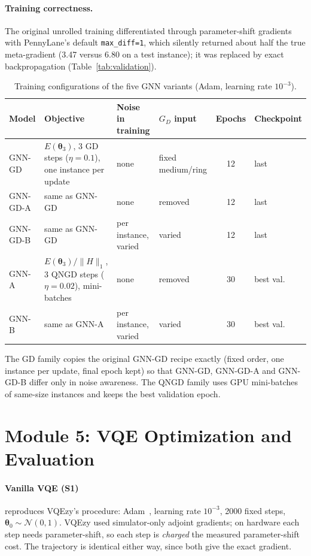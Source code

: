 \documentclass{ssnreview}
\begin{document}
\paragraph{Training correctness.} The original unrolled training differentiated through
parameter-shift gradients with PennyLane's default \texttt{max\_diff=1}, which silently returned
about half the true meta-gradient (3.47 versus 6.80 on a test instance); it was replaced by
exact backpropagation (Table~\ref{tab:validation}).

\begin{table}[H]
\centering
\caption{Training configurations of the five GNN variants (Adam, learning rate $10^{-3}$).}\label{tab:configs}
\small
\begin{tabularx}{\textwidth}{L{1.7cm}YL{2.3cm}L{2.2cm}cL{1.5cm}}
\toprule
Model & Objective & Noise in training & $G_D$ input & Epochs & Checkpoint \\
\midrule
GNN-GD   & $E(\boldsymbol\theta_3)$, 3 GD steps ($\eta=0.1$), one instance per update & none & fixed medium/ring & 12 & last \\
GNN-GD-A & same as GNN-GD & none & removed & 12 & last \\
GNN-GD-B & same as GNN-GD & per instance, varied & varied & 12 & last \\
GNN-A    & $E(\boldsymbol\theta_3)/\|H\|_1$, 3 QNGD steps ($\eta=0.02$), mini-batches & none & removed & 30 & best val. \\
GNN-B    & same as GNN-A & per instance, varied & varied & 30 & best val. \\
\bottomrule
\end{tabularx}
\end{table}

The GD family copies the original GNN-GD recipe exactly (fixed order, one instance per update,
final epoch kept) so that GNN-GD, GNN-GD-A and GNN-GD-B differ only in noise awareness. The
QNGD family uses GPU mini-batches of same-size instances and keeps the best validation epoch.

\section{Module 5: VQE Optimization and Evaluation}\label{sec:m5}

\paragraph{Vanilla VQE (S1)} reproduces VQEzy's procedure: Adam~\cite{kingma2015}, learning rate
$10^{-3}$, 2000 fixed steps, $\boldsymbol\theta_0\sim\mathcal N(0,1)$. VQEzy used simulator-only
adjoint gradients; on hardware each step needs parameter-shift, so each step is
\emph{charged} the measured parameter-shift cost. The trajectory is identical either way, since
both give the exact gradient.
\end{document}

